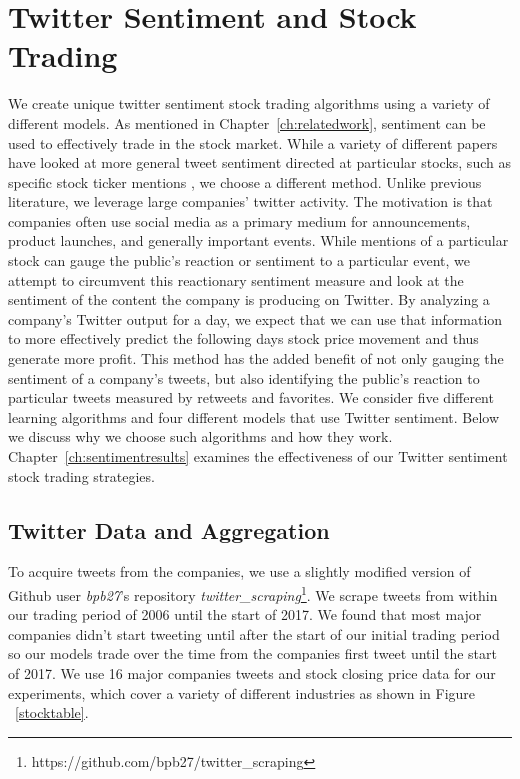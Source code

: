 \documentclass[../thesis.tex]{subfiles}
\begin{document}
\chapter{Twitter Sentiment and Stock Trading}
\label{ch:sentiment}

We create unique twitter sentiment stock trading algorithms using a variety of different models. As mentioned in Chapter~\ref{ch:relatedwork}, sentiment can be used to effectively trade in the stock market. While a variety of different papers have looked at more general tweet sentiment directed at particular stocks, such as specific stock ticker mentions \cite{Mao2013}, we choose a different method. Unlike previous literature, we leverage large companies' twitter activity. The motivation is that companies often use social media as a primary medium for announcements, product launches, and generally important events. While mentions of a particular stock can gauge the public's reaction or sentiment to a particular event, we attempt to circumvent this reactionary sentiment measure and look at the sentiment of the content the company is producing on Twitter. By analyzing a company's Twitter output for a day, we expect that we can use that information to more effectively predict the following days stock price movement and thus generate more profit. This method has the added benefit of not only gauging the sentiment of a company's tweets, but also identifying the public's reaction to particular tweets measured by retweets and favorites. We consider five different learning algorithms and four different models that use Twitter sentiment. Below we discuss why we choose such algorithms and how they work. Chapter~\ref{ch:sentimentresults} examines the effectiveness of our Twitter sentiment stock trading strategies.

\section{Twitter Data and Aggregation}

To acquire tweets from the companies, we use a slightly modified version of Github user \textit{bpb27}'s repository \textit{twitter\_scraping}\footnote{https://github.com/bpb27/twitter\_scraping}. We scrape tweets from within our trading period of 2006 until the start of 2017. We found that most major companies didn't start tweeting until after the start of our initial trading period so our models trade over the time from the companies first tweet until the start of 2017. We use 16 major companies tweets and stock closing price data for our experiments, which cover a variety of different industries as shown in Figure ~\ref{stocktable}. 
\end{document}
